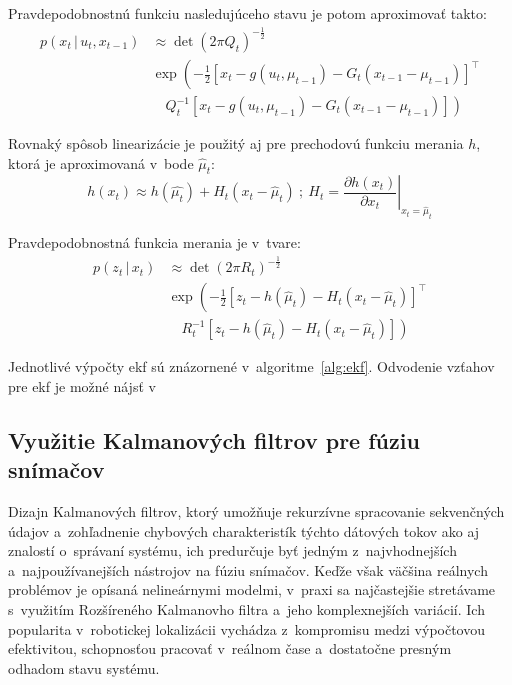     Pravdepodobnostnú funkciu nasledujúceho stavu je potom aproximovať takto:
    \begin{equation}
    \begin{split}
      p(x_t\,|\,u_t, x_{t-1}) 
      & \approx \det(2\pi Q_t)^{-\frac{1}{2}} \\
      & \exp \left( 
          -\frac{1}{2} 
          {\left[
            x_t - g(u_t, \mu_{t-1}) - G_t(x_{t-1} - \mu_{t-1})
          \right]}^{\top}
        \right. \\
      & \left. 
        \quad Q_t^{-1} 
          \left[
            x_t - g(u_t, \mu_{t-1}) - G_t(x_{t-1} - \mu_{t-1})
          \right]
      \right)
    \end{split}
  \end{equation}

    Rovnaký spôsob linearizácie je použitý aj pre prechodovú funkciu merania $h$, ktorá je aproximovaná v~bode $\hat{\mu}_t$:
    \begin{equation}
      h(x_t) \approx h(\hat{\mu_t}) + H_t (x_t - \hat{\mu}_t)\ ;\ H_t = \left. \frac{\partial h(x_t)}{\partial x_t} \right|_{x_t = \hat{\mu}_t}
    \end{equation}
    
    Pravdepodobnostná funkcia merania je v~tvare:
    \begin{equation}
      \begin{split}
      p(z_t\,|\,x_t) 
      & \approx \det(2\pi R_t)^{-\frac{1}{2}} \\
      & \exp\left( 
          -\frac{1}{2} 
          {\left[
            z_t - h(\hat{\mu}_t) - H_t(x_t - \hat{\mu}_t)
          \right]}^{\top}
        \right. \\
      & \left. 
        \quad  R_t^{-1} 
          \left[
            z_t - h(\hat{\mu}_t) - H_t(x_t - \hat{\mu}_t)
          \right]
      \right)
    \end{split}
    \end{equation}
    
    Jednotlivé výpočty \acrshort{ekf} sú znázornené v~algoritme~\ref{alg:ekf}. Odvodenie vzťahov pre \acrshort{ekf} je možné nájsť v~\cite[kap. 3.3.3]{thrunProbabilisticRobotics2005}

\subsection{Využitie Kalmanových filtrov pre fúziu snímačov}

  Dizajn Kalmanových filtrov, ktorý umožňuje rekurzívne spracovanie sekvenčných údajov a~zohľadnenie chybových charakteristík týchto dátových tokov ako aj znalostí o~správaní systému, ich predurčuje byť jedným z~najvhodnejších a~najpoužívanejších nástrojov na fúziu snímačov. Keďže však väčšina reálnych problémov je opísaná nelineárnymi modelmi, v~praxi sa najčastejšie stretávame s~využitím Rozšíreného Kalmanovho filtra a~jeho komplexnejších variácií. Ich popularita v~robotickej lokalizácii vychádza z~kompromisu medzi výpočtovou efektivitou, schopnosťou pracovať v~reálnom čase a~dostatočne presným odhadom stavu systému.

